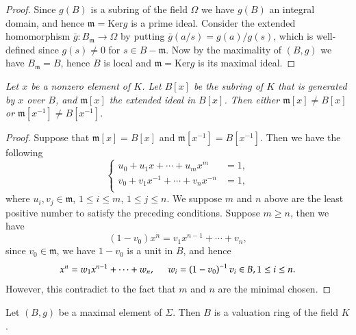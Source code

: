 \begin{proof}
Since $g(B)$ is a subring of the field $\Omega$ we have $g(B)$ an integral domain, and hence $\mathfrak{m}=\mathrm{Ker}g$ is a prime ideal. Consider the extended homomorphism $\bar{g}:B_\mathfrak{m}\to\Omega$ by putting $\bar{g}(a/s)=g(a)/g(s)$, which is well-defined since $g(s)\ne 0$ for $s\in B-\mathfrak{m}$. Now by the maximality of $(B,g)$ we have $B_\mathfrak{m}=B$, hence $B$ is local and $\mathfrak{m}=\mathrm{Ker}g$ is its maximal ideal.
\end{proof}
\begin{lemma}\em
Let $x$ be a nonzero element of $K$. Let $B[x]$ be the subring of $K$ that is generated by $x$ over $B$, and $\mathfrak{m}[x]$ the extended ideal in $B[x]$. Then either $\mathfrak{m}[x]\ne B[x]$ or $\mathfrak{m}[x^{-1}]\ne B[x^{-1}]$.
\end{lemma}
\begin{proof}
Suppose that $\mathfrak{m}[x]=B[x]$ and $\mathfrak{m}[x^{-1}]=B[x^{-1}]$. Then we have the following 
$$
\left\{ \begin{aligned}
	u_0+u_1x+\cdots +u_mx^m&=1,\\
	v_0+v_1x^{-1}+\cdots +v_nx^{-n}&=1,\\
\end{aligned} \right. 
$$
where $u_i,v_j\in\mathfrak{m}$, $1\le i\le m$, $1\le j\le n$. We suppose $m$ and $n$ above are the least positive number to satisfy the preceding conditions. Suppose $m\ge n$, then we have 
$$
\left( 1-v_0 \right) x^n=v_1x^{n-1}+\cdots +v_n,
$$
since $v_0\in\mathfrak{m}$, we have $1-v_0$ is a unit in $B$, and hence 
$$
x^n=w_1x^{n-1}+\cdots +w_n,\hspace{0.5cm}w_i=\left( 1-v_0 \right) ^{-1}v_i\in B,1\le i\le n.
$$
However, this contradict to the fact that $m$ and $n$ are the minimal chosen.
\end{proof}
\begin{theorem}
Let $(B,g)$ be a maximal element of $\Sigma$. Then $B$ is a valuation ring of the field $K$.
\end{theorem}
